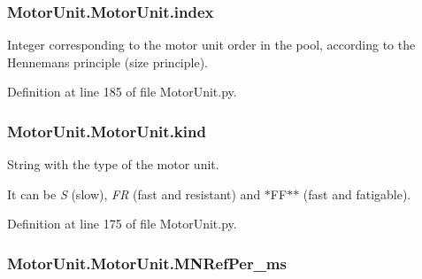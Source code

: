 \subsubsection[{\texorpdfstring{index}{index}}]{\setlength{\rightskip}{0pt plus 5cm}Motor\+Unit.\+Motor\+Unit.\+index}\hypertarget{class_motor_unit_1_1_motor_unit_a4f3205a9273aabb92d425992d91a1848}{}\label{class_motor_unit_1_1_motor_unit_a4f3205a9273aabb92d425992d91a1848}


Integer corresponding to the motor unit order in the pool, according to the Henneman\textquotesingle{}s principle (size principle). 



Definition at line 185 of file Motor\+Unit.\+py.

\subsubsection[{\texorpdfstring{kind}{kind}}]{\setlength{\rightskip}{0pt plus 5cm}Motor\+Unit.\+Motor\+Unit.\+kind}\hypertarget{class_motor_unit_1_1_motor_unit_a08ed5171ba46e0b1ea5bc7d08296c612}{}\label{class_motor_unit_1_1_motor_unit_a08ed5171ba46e0b1ea5bc7d08296c612}


String with the type of the motor unit. 

It can be {\itshape S} (slow), {\itshape FR} (fast and resistant) and $\ast$\+F\+F$\ast$$\ast$ (fast and fatigable). 

Definition at line 175 of file Motor\+Unit.\+py.

\subsubsection[{\texorpdfstring{M\+N\+Ref\+Per\+\_\+ms}{MNRefPer_ms}}]{\setlength{\rightskip}{0pt plus 5cm}Motor\+Unit.\+Motor\+Unit.\+M\+N\+Ref\+Per\+\_\+ms}\hypertarget{class_motor_unit_1_1_motor_unit_abbdaa195ac00926d96d509ae01dcda05}{}\label{class_motor_unit_1_1_motor_unit_abbdaa195ac00926d96d509ae01dcda05}


